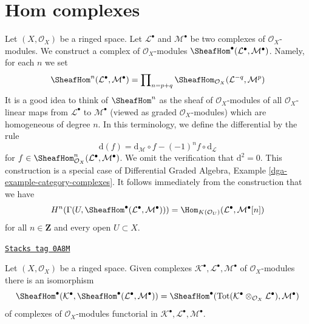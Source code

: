\section{Hom complexes}
\label{cohomology-section-hom-complexes}
Let $(X, \mathcal{O}_X)$ be a ringed space. Let
$\mathcal{L}^\bullet$ and $\mathcal{M}^\bullet$ be two complexes
of $\mathcal{O}_X$-modules. We construct a complex
of $\mathcal{O}_X$-modules
$\SheafHom^\bullet(\mathcal{L}^\bullet, \mathcal{M}^\bullet)$.
Namely, for each $n$ we set
$$
\SheafHom^n(\mathcal{L}^\bullet, \mathcal{M}^\bullet) =
\prod\nolimits_{n = p + q}
\SheafHom_{\mathcal{O}_X}(\mathcal{L}^{-q}, \mathcal{M}^p)
$$
It is a good idea to think of $\SheafHom^n$ as the
sheaf of $\mathcal{O}_X$-modules of all $\mathcal{O}_X$-linear
maps from $\mathcal{L}^\bullet$ to $\mathcal{M}^\bullet$
(viewed as graded $\mathcal{O}_X$-modules) which are homogeneous
of degree $n$. In this terminology, we define the differential by the rule
$$
\text{d}(f) =
\text{d}_\mathcal{M} \circ f - (-1)^n f \circ \text{d}_\mathcal{L}
$$
for
$f \in \SheafHom^n_{\mathcal{O}_X}(\mathcal{L}^\bullet, \mathcal{M}^\bullet)$.
We omit the verification that $\text{d}^2 = 0$.
This construction is a special case of
Differential Graded Algebra, Example \ref{dga-example-category-complexes}.
It follows immediately from the construction that we have
\begin{equation}
\label{equation-cohomology-hom-complex}
H^n(\Gamma(U, \SheafHom^\bullet(\mathcal{L}^\bullet, \mathcal{M}^\bullet))) =
\Hom_{K(\mathcal{O}_U)}(\mathcal{L}^\bullet, \mathcal{M}^\bullet[n])
\end{equation}
for all $n \in \mathbf{Z}$ and every open $U \subset X$.

\begin{lemma}[Compose]
\label{cohomology-lemma-compose}
\href{https://stacks.math.columbia.edu/tag/0A8M}{\texttt{Stacks tag 0A8M}}

Let $(X, \mathcal{O}_X)$ be a ringed space.
Given complexes $\mathcal{K}^\bullet, \mathcal{L}^\bullet, \mathcal{M}^\bullet$
of $\mathcal{O}_X$-modules there is an isomorphism
$$
\SheafHom^\bullet(\mathcal{K}^\bullet,
\SheafHom^\bullet(\mathcal{L}^\bullet, \mathcal{M}^\bullet))
=
\SheafHom^\bullet(\text{Tot}(\mathcal{K}^\bullet \otimes_{\mathcal{O}_X}
\mathcal{L}^\bullet), \mathcal{M}^\bullet)
$$
of complexes of $\mathcal{O}_X$-modules functorial in
$\mathcal{K}^\bullet, \mathcal{L}^\bullet, \mathcal{M}^\bullet$.
\end{lemma}

